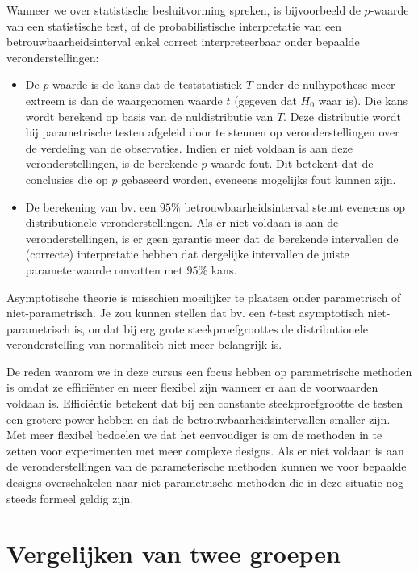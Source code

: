 \documentclass[
  12pt,dutch,coursenotes]{book}
\begin{document}
Wanneer we over statistische besluitvorming spreken, is bijvoorbeeld de \(p\)-waarde van een statistische test, of de probabilistische interpretatie van een betrouwbaarheidsinterval enkel correct interpreteerbaar onder bepaalde veronderstellingen:

\begin{itemize}
\item
  De \(p\)-waarde is de kans dat de teststatistiek \(T\) onder de nulhypothese meer extreem is dan de waargenomen waarde \(t\) (gegeven dat \(H_0\) waar is). Die kans wordt berekend op basis van de nuldistributie van \(T\). Deze distributie wordt bij parametrische testen afgeleid door te steunen op veronderstellingen over de verdeling van de observaties. Indien er niet voldaan is aan deze veronderstellingen, is de berekende \(p\)-waarde fout. Dit betekent dat de conclusies die op \(p\) gebaseerd worden, eveneens mogelijks fout kunnen zijn.
\item
  De berekening van bv. een \(95\%\) betrouwbaarheidsinterval steunt eveneens op distributionele veronderstellingen. Als er niet voldaan is aan de veronderstellingen, is er geen garantie meer dat de berekende intervallen de (correcte) interpretatie hebben dat dergelijke intervallen de juiste parameterwaarde omvatten met \(95\%\) kans.
\end{itemize}

Asymptotische theorie is misschien moeilijker te plaatsen onder parametrisch of niet-parametrisch. Je zou kunnen stellen dat bv. een \(t\)-test asymptotisch niet-parametrisch is, omdat bij erg grote steekproefgroottes de distributionele veronderstelling van normaliteit niet meer belangrijk is.

De reden waarom we in deze cursus een focus hebben op parametrische methoden is omdat ze efficiënter en meer flexibel zijn wanneer er aan de voorwaarden voldaan is. Efficiëntie betekent dat bij een constante steekproefgrootte de testen een grotere power hebben en dat de betrouwbaarheidsintervallen smaller zijn. Met meer flexibel bedoelen we dat het eenvoudiger is om de methoden in te zetten voor experimenten met meer complexe designs.
Als er niet voldaan is aan de veronderstellingen van de parameterische methoden kunnen we voor bepaalde designs overschakelen naar niet-parametrische methoden die in deze situatie nog steeds formeel geldig zijn.

\hypertarget{vergelijken-van-twee-groepen}{%
\section{Vergelijken van twee groepen}\label{vergelijken-van-twee-groepen}}
\end{document}
